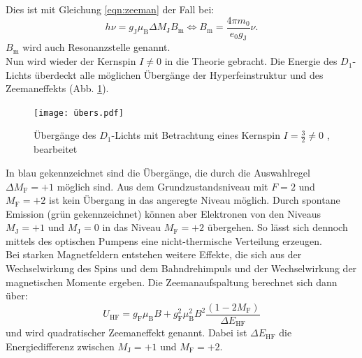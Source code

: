 Dies ist mit Gleichung \eqref{eqn:zeeman} der Fall bei:
\begin{equation}
  h \nu = g_{\text{J}} \mu_{\text{B}} \Delta M_{\text{J}} B_{\text{m}} \Leftrightarrow B_{\text{m}} = \frac{4 \pi m_{0}}{e_{0} g_{\text{J}}} \nu.
\label{eqn:resonanz}
\end{equation}
$B_{\text{m}}$ wird auch Resonanzstelle genannt.
%
%
\\Nun wird wieder der Kernspin $I≠0$ in die Theorie gebracht.
Die Energie des $D_{1}$-Lichts überdeckt alle möglichen Übergänge der Hyperfeinstruktur und des Zeemaneffekts (Abb. \ref{fig:übergänge}).
\begin{figure}[h!]
  \centering
  \texttt{[image: übers.pdf]}
  \caption{Übergänge des $D_{1}$-Lichts mit Betrachtung eines Kernspin $I=\frac{3}{2}≠0$ \cite{1}, bearbeitet}
  \label{fig:übergänge}
\end{figure}
In blau gekennzeichnet sind die Übergänge, die durch die Auswahlregel $\Delta M_{\text{F}}=+1$ möglich sind.
Aus dem Grundzustandsniveau mit $F=2$ und $M_{\text{F}}=+2$ ist kein Übergang in das angeregte Niveau möglich.
Durch spontane Emission (grün gekennzeichnet) können aber Elektronen von den Niveaus $M_{\text{J}}=+1$ und $M_{\text{J}}=0$ in das Niveau $M_{\text{F}}=+2$ übergehen.
So lässt sich dennoch mittels des optischen Pumpens eine nicht-thermische Verteilung erzeugen.
%
%
\\Bei starken Magnetfeldern entstehen weitere Effekte, die sich aus der Wechselwirkung des Spins und dem Bahndrehimpuls und der Wechselwirkung der magnetischen Momente ergeben.
Die Zeemanaufspaltung berechnet sich dann über:
\begin{equation}
U_{\text{HF}}= g_{\text{F}} \mu_{\text{B}} B + g_{\text{F}}^2 \mu_{\text{B}}^2 B^2 \frac{(1- 2M_{\text{F}})}{\Delta E_{\text{HF}}}
\label{eqn:quadzeeman}
\end{equation}
und wird quadratischer Zeemaneffekt genannt.
Dabei ist $\Delta E_{\text{HF}}$ die Energiedifferenz zwischen $M_{\text{J}}=+1$ und $M_{\text{F}}=+2$.
